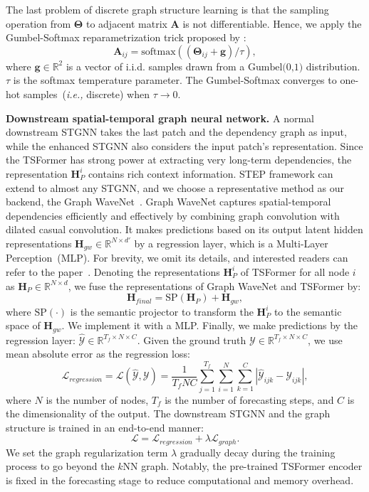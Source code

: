 \documentclass[sigconf]{acmart}
\def\bb#1{\mathbb{#1}}
\def\cal#1{\mathcal{#1}}
\newcommand{\ie}{\textit{i.e.,}\xspace}
\begin{document}
The last problem of discrete graph structure learning is that the sampling operation from $\mathbf{\Theta}$ to adjacent matrix $\mathbf{A}$ is not differentiable.
Hence, we apply the Gumbel-Softmax reparametrization trick proposed by \cite{Gumbel1, Gumbel2}:
\begin{equation}
    \mathbf{A}_{ij}=\text{softmax}((\mathbf{\Theta}_{ij}+\mathbf{g})/\tau),
\end{equation}
where $\mathbf{g}\in \mathbb{R}^2$ is a vector of i.i.d. samples drawn from a $\text{Gumbel(0,1)}$ distribution.
$\tau$ is the softmax temperature parameter.
The Gumbel-Softmax converges to one-hot samples~(\ie discrete) when $\tau \rightarrow 0$.

\noindent\textbf{Downstream spatial-temporal graph neural network.}
A normal downstream STGNN takes the last patch and the dependency graph as input, while the enhanced STGNN also considers the input patch's representation.
Since the TSFormer has strong power at extracting very long-term dependencies, the representation $\mathbf{H}^i_P$ contains rich context information.
STEP framework can extend to almost any STGNN, and we choose a representative method as our backend, the Graph WaveNet~\cite{GWNet}.
Graph WaveNet captures spatial-temporal dependencies efficiently and effectively by combining graph convolution with dilated casual convolution. 
It makes predictions based on its output latent hidden representations $\mathbf{H}_{gw}\in\mathbb{R}^{N\times d'}$ by a regression layer, which is a Multi-Layer Perception~(MLP).
{\color{black}For brevity, we omit its details, and interested readers can refer to the paper~\cite{GWNet}}.
Denoting the representations $\mathbf{H}^i_P$ of TSFormer for all node $i$ as $\mathbf{H}_P\in\mathbb{R}^{N\times d}$, we fuse the representations of Graph WaveNet and TSFormer by:
\begin{equation}
    \mathbf{H}_{final}=\text{SP}(\mathbf{H}_P) + \mathbf{H}_{gw},
    \label{fuse}
\end{equation}
where $\text{SP}(\cdot)$ is the semantic projector to transform the $\mathbf{H}^i_P$ to the semantic space of $\mathbf{H}_{gw}$. We implement it with a MLP.
Finally, we make predictions by the regression layer:  
$\hat{\mathcal{Y}}\in\bb{R}^{T_f\times N \times C}$. 
Given the ground truth $\cal{Y}\in\bb{R}^{T_f\times N \times C}$, we use mean absolute error as the regression loss:
\begin{equation}
    \cal{L}_{regression} = \cal{L}(\hat{\cal{Y}}, \cal{Y})=\frac{1}{T_fNC}
    \sum_{j=1}^{T_f}\sum_{i=1}^{N}\sum_{k=1}^{C}|\hat{\cal{Y}}_{ijk} - \cal{Y}_{ijk}|, 
    \label{loss}
\end{equation}
where $N$ is the number of nodes, $T_f$ is the number of forecasting steps, and $C$ is the dimensionality of the output.
The downstream STGNN and the graph structure is trained in an end-to-end manner:
\begin{equation}
    \mathcal{L} = \mathcal{L}_{regression} + \lambda \mathcal{L}_{graph}.
    \label{full_loss}
\end{equation}
We set the graph regularization term $\lambda$ gradually decay during the training process to go beyond the $k$NN graph.
Notably, the pre-trained TSFormer encoder is fixed in the forecasting stage to reduce computational and memory overhead.
\end{document}
